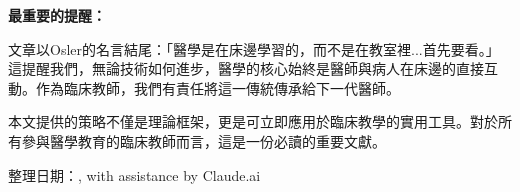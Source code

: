 \documentclass[12pt,a4paper]{article}
\newcommand{\mydate}{\DTMtoday}
\begin{document}
\begin{importantbox}
\textbf{最重要的提醒：}

文章以Osler的名言結尾：「醫學是在床邊學習的，而不是在教室裡...首先要看。」這提醒我們，無論技術如何進步，醫學的核心始終是醫師與病人在床邊的直接互動。作為臨床教師，我們有責任將這一傳統傳承給下一代醫師。

本文提供的策略不僅是理論框架，更是可立即應用於臨床教學的實用工具。對於所有參與醫學教育的臨床教師而言，這是一份必讀的重要文獻。

整理日期：\mydate, with assistance by Claude.ai
\end{importantbox}
\end{document}
